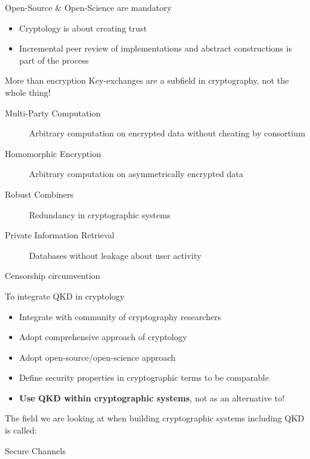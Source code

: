 \begin{frame}{Open-Source \& Open-Science are mandatory}
  \begin{itemize}
    \item Cryptology is about creating trust
    \item Incremental peer review of implementations and abstract constructions is part of the process
  \end{itemize}
\end{frame}

\begin{frame}{More than encryption}
  \small
  Key-exchanges are a subfield in cryptography, not the whole thing!

  \begin{description}
    \item[Multi-Party Computation] Arbitrary computation on encrypted data without cheating by consortium
    \item[Homomorphic Encryption] Arbitrary computation on asymmetrically encrypted data
    \item[Robust Combiners] Redundancy in cryptographic systems
    \item[Private Information Retrieval] Databases without leakage about user activity
    \item[Censorship circumvention]
  \end{description}
\end{frame}

\begin{frame}{To integrate QKD in cryptology}
  \small
  \begin{itemize}
    \item Integrate with community of cryptography researchers
    \item Adopt comprehensive approach of cryptology
    \item Adopt open-source/open-science approach
    \item Define security properties in cryptographic terms to be comparable
    \item \textbf{Use QKD within cryptographic systems}, not as an alternative to!
  \end{itemize}

  The field we are looking at when building cryptographic systems including QKD is called:

  \centering\large Secure Channels
\end{frame}
